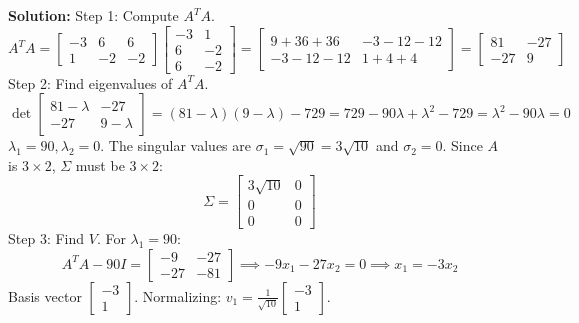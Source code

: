 \documentclass[11pt, letterpaper]{article}
\theoremstyle{definition}
\theoremstyle{remark}
\begin{document}
\textbf{Solution:}
Step 1: Compute $A^TA$.
\[
A^TA = \begin{bmatrix} -3 & 6 & 6 \\ 1 & -2 & -2 \end{bmatrix} \begin{bmatrix} -3 & 1 \\ 6 & -2 \\ 6 & -2 \end{bmatrix} = \begin{bmatrix} 9+36+36 & -3-12-12 \\ -3-12-12 & 1+4+4 \end{bmatrix} = \begin{bmatrix} 81 & -27 \\ -27 & 9 \end{bmatrix}
\]
Step 2: Find eigenvalues of $A^TA$.
\[
\det \begin{bmatrix} 81 - \lambda & -27 \\ -27 & 9 - \lambda \end{bmatrix} = (81 - \lambda)(9 - \lambda) - 729 = 729 - 90\lambda + \lambda^2 - 729 = \lambda^2 - 90\lambda = 0
\]
$\lambda_1 = 90, \lambda_2 = 0$. The singular values are $\sigma_1 = \sqrt{90} = 3\sqrt{10}$ and $\sigma_2 = 0$.
Since $A$ is $3 \times 2$, $\Sigma$ must be $3 \times 2$:
\[
\Sigma = \begin{bmatrix} 3\sqrt{10} & 0 \\ 0 & 0 \\ 0 & 0 \end{bmatrix}
\]
Step 3: Find $V$.
For $\lambda_1 = 90$:
\[
A^TA - 90I = \begin{bmatrix} -9 & -27 \\ -27 & -81 \end{bmatrix} \implies -9x_1 - 27x_2 = 0 \implies x_1 = -3x_2
\]
Basis vector $\begin{bmatrix} -3 \\ 1 \end{bmatrix}$. Normalizing: $v_1 = \frac{1}{\sqrt{10}}\begin{bmatrix} -3 \\ 1 \end{bmatrix}$.
\end{document}
